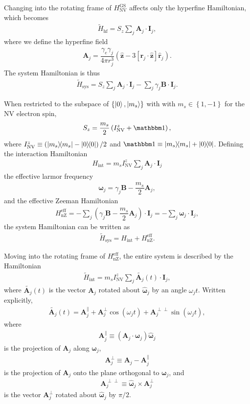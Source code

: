 \documentclass[twocolumn]{revtex4}
\renewcommand{\t}{\text} %
\newcommand{\f}[2]{\dfrac{#1}{#2}} %
\newcommand{\p}[1]{\left(#1\right)} %
\renewcommand{\sp}[1]{\left[#1\right]} %
\renewcommand{\set}[1]{\left\{#1\right\}} %
\renewcommand{\v}{\bm} %
\newcommand{\uv}[1]{\hat{\v{#1}}} %
\renewcommand{\c}{\cdot} %
\newcommand{\NV}{\t{NV}}
\begin{document}
Changing into the rotating frame of $H_\NV^\t{GS}$ affects only the
hyperfine Hamiltonian, which becomes
\begin{align}
  \tilde H_\t{hf} = S_z\sum_j \v A_j\c\v I_j,
\end{align}
where we define the hyperfine field
\begin{align}
  \v A_j = \f{\gamma_e\gamma_j}{4\pi r_j^3}\p{\uv z - 3\sp{\uv
  r_j\c\uv z}\uv r_j}.
\end{align}
The system Hamiltonian is thus
\begin{align}
  \tilde H_\t{sys} = S_z\sum_j \v A_j\c\v I_j
  -\sum_j\gamma_j\v B\c\v I_j.
\end{align}

When restricted to the subspace of $\set{\ket0,\ket{m_s}}$ with with
$m_s\in\set{1,-1}$ for the NV electron spin,
\begin{align}
  S_z = \f{m_s}2\p{I_\NV^z+\mathbbm1},
\end{align}
where $I_\NV^z\equiv\p{\op{m_s}-\op{0}}/2$ and
$\mathbbm1\equiv\op{m_s}+\op{0}$. Defining the interaction Hamiltonian
\begin{align}
  H_\t{int} = m_sI_\NV^z\sum_j\v A_j\c\v I_j
\end{align}
the effective larmor frequency
\begin{align}
  \v\omega_j = \gamma_j\v B - \f{m_s}2\v A_j,
\end{align}
and the effective Zeeman Hamiltonian
\begin{align}
  H_\t{nZ}^\t{eff} = -\sum_j\p{\gamma_j\v B - \f{m_s}2\v A_j}\c\v I_j
  = -\sum_j\v\omega_j\c\v I_j,
\end{align}
the system Hamiltonian can be written as
\begin{align}
  \tilde H_\t{sys} = H_\t{int} + H_\t{nZ}^\t{eff}.
  \label{H_sys_int_nZ}
\end{align}

Moving into the rotating frame of $H_\t{nZ}^\t{eff}$, the entire
system is described by the Hamiltonian
\begin{align}
  \tilde H_\t{int} = m_sI_\NV^z
  \sum_j\tilde{\v A_j}\p{t}\c\v I_j,
  \label{H_int_no_DD}
\end{align}
where $\tilde{\v A_j}\p{t}$ is the vector $\v A_j$ rotated about
$\uv\omega_j$ by an angle $\omega_jt$. Written explicitly,
\begin{align}
  \tilde{\v A_j}\p{t} = \v A_j^\parallel + \v A_j^\perp\cos\p{\omega_jt}
  + \v A_j^{\perp\perp}\sin\p{\omega_jt},
  \label{A_rot}
\end{align}
where
\begin{align}
  \v A_j^\parallel\equiv\p{\v A_j\c\uv\omega_j}\uv\omega_j
\end{align}
is the projection of $\v A_j$ along $\v \omega_j$,
\begin{align}
\v A_j^\perp\equiv\v A_j-\v A_j^\parallel
\end{align}
is the projection of $\v A_j$ onto the plane orthogonal to
$\v\omega_j$, and
\begin{align}
\v A_j^{\perp\perp}\equiv\uv\omega_j\times\v A_j^\perp
\end{align}
is the vector $\v A_j^\perp$ rotated about $\uv\omega_j$ by $\pi/2$.
\end{document}
